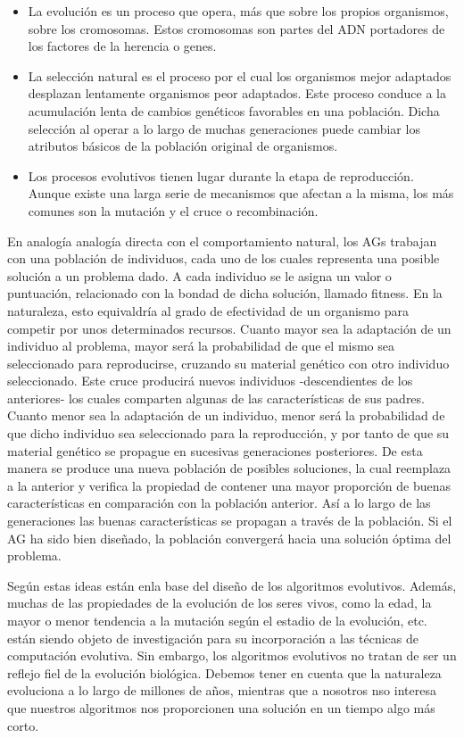 \documentclass[runningheads]{llncs}
\begin{document}
\begin{itemize}
 \item La evolución es un proceso que opera, más que sobre los propios organismos, sobre los cromosomas. Estos cromosomas son 
 partes del ADN portadores de los factores de la herencia o genes.
 \item La selección natural es el proceso por el cual los organismos mejor adaptados desplazan lentamente organismos peor adaptados. 
 Este proceso conduce a la acumulación lenta de cambios genéticos favorables en una población. Dicha selección al operar a lo 
 largo de muchas generaciones puede cambiar los atributos básicos de la población original de organismos.
 \item Los procesos evolutivos tienen lugar durante la etapa de reproducción. Aunque existe una larga serie de mecanismos 
 que afectan a la misma, los más comunes son la mutación y el cruce o recombinación.
\end{itemize}


En analogía analogía directa con el comportamiento natural, los AGs trabajan con una población de individuos, cada uno de los cuales 
representa una posible solución a un problema dado. A cada individuo se le asigna un valor o puntuación, relacionado con la bondad 
de dicha solución, llamado fitness. En la naturaleza, esto equivaldría al grado de efectividad de un organismo para competir por 
unos determinados recursos. Cuanto mayor sea la adaptación de un individuo al problema, mayor será la probabilidad de que el mismo 
sea seleccionado para reproducirse, cruzando su material genético con otro individuo seleccionado. Este cruce producirá nuevos 
individuos -descendientes de los anteriores- los cuales comparten algunas de las características de sus padres. Cuanto
menor sea la adaptación de un individuo, menor será la probabilidad de que dicho individuo sea seleccionado para la reproducción, 
y por tanto de que su material genético se propague en sucesivas generaciones posteriores. De esta manera se produce una nueva población
de posibles soluciones, la cual reemplaza a la anterior y verifica la propiedad de contener una mayor proporción de buenas 
características en comparación con la población anterior. Así a lo largo de las generaciones las buenas características se
propagan a través de la población.  Si el AG ha sido bien diseñado, la población convergerá hacia una solución óptima del problema.

Según \cite{Enfoque09} estas ideas están enla base del diseño de los algoritmos evolutivos. Además, muchas de las propiedades de la
evolución de los seres vivos, como la edad, la mayor o menor tendencia a la mutación según el estadio de la evolución, etc. están
siendo objeto de investigación para su incorporación a las técnicas de computación evolutiva. Sin embargo, los algoritmos evolutivos
no tratan de ser un reflejo fiel de la evolución biológica. Debemos tener en cuenta que la naturaleza evoluciona a lo largo de millones
de años, mientras que a nosotros nso interesa que nuestros algoritmos nos proporcionen una solución en un tiempo algo más corto.
\end{document}
